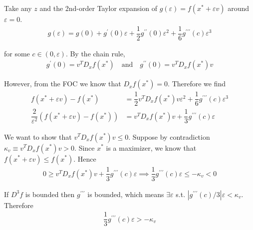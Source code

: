 \documentclass{article}
\begin{document}
\begin{enumerate}[1.]
\begin{enumerate}[a)]
        \solution Take any $z$ and the 2nd-order Taylor expansion of $g(\varepsilon) = f(x^* + \varepsilon v)$ around $\varepsilon = 0$.
        \begin{align*}
          g(\varepsilon)
          =
          g(0) 
          + g^\prime(0) \varepsilon 
          + \dfrac{1}{2} g^{\prime\prime}(0) \varepsilon^2
          + \dfrac{1}{6} g^{\prime\prime\prime}(c) \varepsilon^3
        \end{align*}

        for some $c \in (0, \varepsilon)$. By the chain rule,
        \begin{align*}
          g^{\prime}(0)
          =
          v^T D_x f(x^*)
          \quad\text{and}\quad
          g^{\prime\prime}(0)
          =
          v^T D_x f(x^*) v
        \end{align*}

        However, from the FOC we know that $D_x f(x^*) = 0$.  Therefore we find
        \begin{align*}
          f(x^* + \varepsilon v) - f(x^*)
          &
          =
          \dfrac{1}{2} v^T D_x f(x^*) v \varepsilon^2
          + \dfrac{1}{6} g^{\prime\prime\prime}(c) \varepsilon^3
          \\
          \dfrac{2}{\varepsilon^2}
          \left(
            f(x^* + \varepsilon v) - f(x^*)
          \right)
          &
          =
          v^T D_x f(x^*) v
          +
          \dfrac{1}{3} g^{\prime\prime\prime}(c) \varepsilon
        \end{align*}

        We want to show that $v^T D_x f(x^*) v \le 0$. Suppose by contradiction $\kappa_v \equiv v^T D_x f(x^*) v > 0$. Since $x^*$ is a maximizer, we know that $f(x^* + \varepsilon v) \le f(x^*)$. Hence
        \begin{align*}
          0
          \ge
          v^T D_x f(x^*) v
          +
          \dfrac{1}{3} g^{\prime\prime\prime}(c) \varepsilon
          \implies
          \dfrac{1}{3} g^{\prime\prime\prime}(c) \varepsilon
          \le
          - \kappa_v
          <
          0
        \end{align*}

        If $D^3 f$ is bounded then $g^{\prime\prime\prime}$ is bounded, which means $\exists \varepsilon$ s.t. $|g^{\prime\prime\prime}(c) / 3| \varepsilon < \kappa_v$. Therefore
        \begin{align*}
          \dfrac{1}{3} g^{\prime\prime\prime}(c) \varepsilon
          >
          - \kappa_v
        \end{align*}


\end{enumerate}
\end{enumerate}
\end{document}
